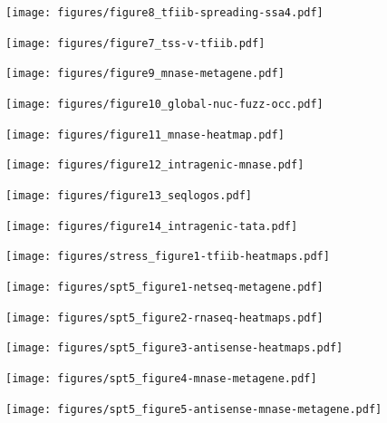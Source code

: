 \documentclass[aspectratio=169]{beamer}
\begin{document}
\begin{frame}
\texttt{[image: figures/figure8\_tfiib-spreading-ssa4.pdf]}
\end{frame}

\begin{frame}
\texttt{[image: figures/figure7\_tss-v-tfiib.pdf]}
\end{frame}

\begin{frame}
\texttt{[image: figures/figure9\_mnase-metagene.pdf]}
\end{frame}

\begin{frame}
\texttt{[image: figures/figure10\_global-nuc-fuzz-occ.pdf]}
\end{frame}

\begin{frame}
\texttt{[image: figures/figure11\_mnase-heatmap.pdf]}
\end{frame}

\begin{frame}
\texttt{[image: figures/figure12\_intragenic-mnase.pdf]}
\end{frame}

\begin{frame}
\texttt{[image: figures/figure13\_seqlogos.pdf]}
\end{frame}

\begin{frame}
\texttt{[image: figures/figure14\_intragenic-tata.pdf]}
\end{frame}

\begin{frame}
\texttt{[image: figures/stress\_figure1-tfiib-heatmaps.pdf]}
\end{frame}

\begin{frame}
\texttt{[image: figures/spt5\_figure1-netseq-metagene.pdf]}
\end{frame}

\begin{frame}
\texttt{[image: figures/spt5\_figure2-rnaseq-heatmaps.pdf]}
\end{frame}

\begin{frame}
\texttt{[image: figures/spt5\_figure3-antisense-heatmaps.pdf]}
\end{frame}

\begin{frame}
\texttt{[image: figures/spt5\_figure4-mnase-metagene.pdf]}
\end{frame}

\begin{frame}
\texttt{[image: figures/spt5\_figure5-antisense-mnase-metagene.pdf]}
\end{frame}
\end{document}
